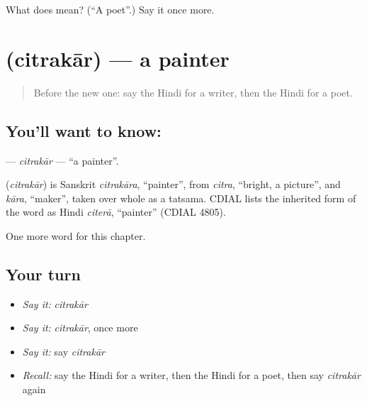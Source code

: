 \begin{tcolorbox}[breakable,colback=teal!4,colframe=teal!35!black,title={Before you move on}]
What does  mean? (\textquotedblleft{}A poet\textquotedblright{}.) Say it once more.
\end{tcolorbox}
\section[\texorpdfstring{\hi{चित्रकार} (citrakār)}{चित्रकार (citrakār)}]{ (citrakār) — a painter}

\label{lesson:HI-C195-citrakar}



\begin{quote}
Before the new one: say the Hindi for a writer, then the Hindi for a poet.
\end{quote}

\subsection*{You'll want to know: }
\textbf{} — \emph{citrakār} — \textquotedblleft{}a painter\textquotedblright{}.

\begin{cousinweb}
\textbf{} (\emph{citrakār}) is Sanskrit \emph{citrakāra}, \textquotedblleft{}painter\textquotedblright{}, from \emph{citra}, \textquotedblleft{}bright, a picture\textquotedblright{}, and \emph{kāra}, \textquotedblleft{}maker\textquotedblright{}, taken over whole as a tatsama. CDIAL lists the inherited form of the word as Hindi \emph{citerā}, \textquotedblleft{}painter\textquotedblright{} (CDIAL 4805).
\end{cousinweb}

\begin{grammarlens}[title={What you've built}]
One more word for this chapter.
\end{grammarlens}

\subsection*{Your turn}
\begin{itemize}
\raggedright
  \item \emph{Say it:} \emph{citrakār}
  \item \emph{Say it:} \emph{citrakār}, once more
  \item \emph{Say it:} say \emph{citrakār}
  \item \emph{Recall:} say the Hindi for a writer, then the Hindi for a poet, then say \emph{citrakār} again
\end{itemize}

